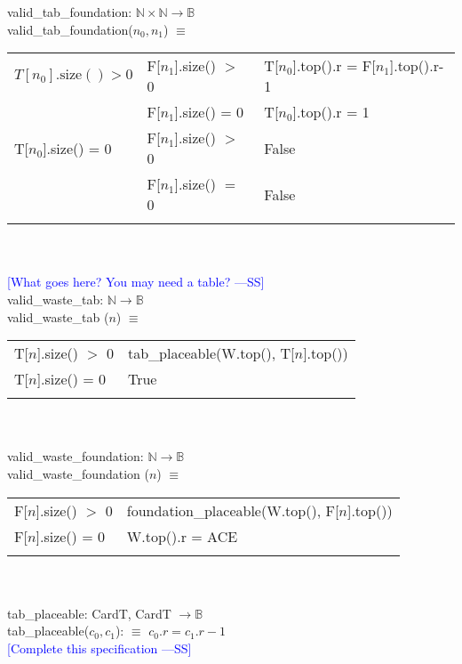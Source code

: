 \documentclass[12pt]{article}
\newcommand{\authornote}[3]{\textcolor{#1}{[#3 ---#2]}}
\newcommand{\authornote}[3]{}
\newcommand{\wss}[1]{\authornote{blue}{SS}{#1}}
\begin{document}
\noindent valid\_tab\_foundation: $\mathbb{N} \times \mathbb{N} \rightarrow \mathbb{B}$\\
\noindent valid\_tab\_foundation($n_0, n_1$) $\equiv$ \\
\begin{tabular}{|p{4cm}|p{3.5cm}|l|}
\hhline{|-|-|-|}
$T[n_0].\text{size}() > 0$ & F[$n_1$].size() $>$ 0 & T[$n_0$].top().r = F[$n_1$].top().r-1\\
\hhline{|~|-|-|}
 & F[$n_1$].size() = 0 & T[$n_0$].top().r = 1 \\
\hhline{|-|-|-|}
T[$n_0$].size() = 0 & F[$n_1$].size() $>$ 0 & False \\
\hhline{|~|-|-|}
& F[$n_1$].size() $=$ 0 & False \\
\hhline{|-|-|-|}
\end{tabular}\\\\ \wss{What goes here?  You
  may need a table?}\\

\noindent valid\_waste\_tab: $\mathbb{N} \rightarrow \mathbb{B}$\\
\noindent valid\_waste\_tab ($n$) $\equiv$

\begin{tabular}{|p{4cm}|l|}
\hhline{|-|-|}
T[$n$].size() $>$ 0 & tab\_placeable(W.top(), T[$n$].top())\\
\hhline{|-|-|}
T[$n$].size() = 0 & True\\
\hhline{|-|-|}
\end{tabular}\\\\

\noindent valid\_waste\_foundation: $\mathbb{N} \rightarrow \mathbb{B}$\\
\noindent valid\_waste\_foundation ($n$) $\equiv$

\begin{tabular}{|p{4cm}|l|}
\hhline{|-|-|}
F[$n$].size() $>$ 0 & foundation\_placeable(W.top(), F[$n$].top())\\
\hhline{|-|-|}
F[$n$].size() = 0 & W.top().r = ACE\\
\hhline{|-|-|}
\end{tabular}\\\\

\noindent tab\_placeable: CardT, CardT $\rightarrow \mathbb{B}$  \\
\noindent tab\_placeable($c_0, c_1$): $\equiv$ $c_0.r = c_1.r -1$ \\
 \wss{Complete this specification}\\
\end{document}
